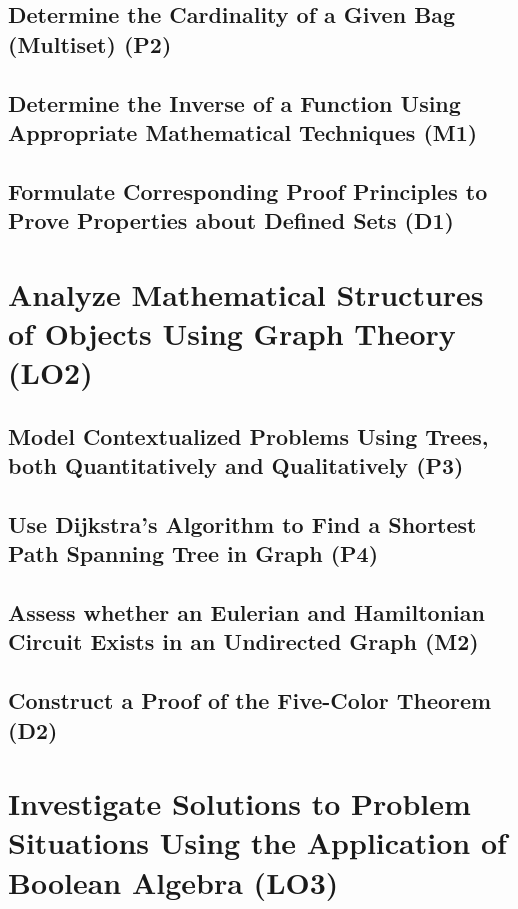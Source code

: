 \documentclass[12pt, a4paper]{report} %
\begin{document}
\section{Determine the Cardinality of a Given Bag (Multiset) (P2)}
\label{sec:P2}
\section{Determine the Inverse of a Function Using Appropriate Mathematical Techniques (M1)}
\label{sec:M1}



\section{Formulate Corresponding Proof Principles to Prove Properties about Defined Sets (D1)}
\label{sec:D1}

\chapter{Analyze Mathematical Structures of Objects Using Graph Theory (LO2)}
\label{chap:LO2}

\section{Model Contextualized Problems Using Trees, both Quantitatively and Qualitatively (P3)}
\label{sec:P3}


\section{Use Dijkstra’s Algorithm to Find a Shortest Path Spanning Tree in Graph (P4)}
\label{sec:P4}

\section{Assess whether an Eulerian and Hamiltonian Circuit Exists in an Undirected Graph (M2)}
\label{sec:M2}

\section{Construct a Proof of the Five-Color Theorem (D2)}
\label{sec:D2}

\chapter{Investigate Solutions to Problem Situations Using the Application of Boolean Algebra (LO3)}
\label{chap:LO3}
\end{document}
